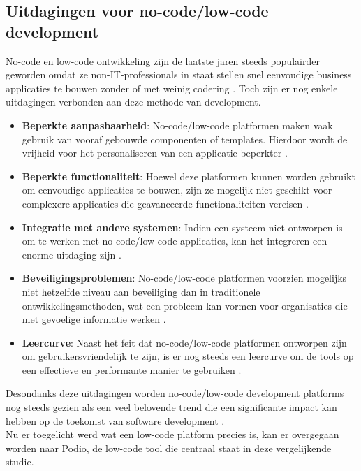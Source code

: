 \subsection{Uitdagingen voor no-code/low-code development}
\label{subsec:uitdagingen_low_code}

No-code en low-code ontwikkeling zijn de laatste jaren steeds populairder geworden omdat ze non-IT-professionals in staat stellen snel eenvoudige business applicaties te bouwen zonder of met weinig codering \autocite{Yan2021}. Toch zijn er nog enkele uitdagingen verbonden aan deze methode van development. \\

\begin{itemize}
    \item \textbf{Beperkte aanpasbaarheid}: No-code/low-code platformen maken vaak gebruik van vooraf gebouwde componenten of templates. Hierdoor wordt de vrijheid voor het personaliseren van een applicatie beperkter \autocite{Yan2021}.
    \item \textbf{Beperkte functionaliteit}: Hoewel deze platformen kunnen worden gebruikt om eenvoudige applicaties te bouwen, zijn ze mogelijk niet geschikt voor complexere applicaties die geavanceerde functionaliteiten vereisen \autocite{Yan2021}.
    \item \textbf{Integratie met andere systemen}: Indien een systeem niet ontworpen is om te werken met no-code/low-code applicaties, kan het integreren een enorme uitdaging zijn \autocite{Ferreira2019}.
    \item \textbf{Beveiligingsproblemen}: No-code/low-code platformen voorzien mogelijks niet hetzelfde niveau aan beveiliging dan in traditionele ontwikkelingsmethoden, wat een probleem kan vormen voor organisaties die met gevoelige informatie werken \autocite{Ploder2019}.
    \item \textbf{Leercurve}: Naast het feit dat no-code/low-code platformen ontworpen zijn om gebruikersvriendelijk te zijn, is er nog steeds een leercurve om de tools op een effectieve en performante manier te gebruiken \autocite{Yan2021}.  
\end{itemize}

Desondanks deze uitdagingen worden no-code/low-code development platforms nog steeds gezien als een veel belovende trend die een significante impact kan hebben op de toekomst van software development \autocite{Yan2021}. \\

Nu er toegelicht werd wat een low-code platform precies is, kan er overgegaan worden naar Podio, de low-code tool die centraal staat in deze vergelijkende studie.

